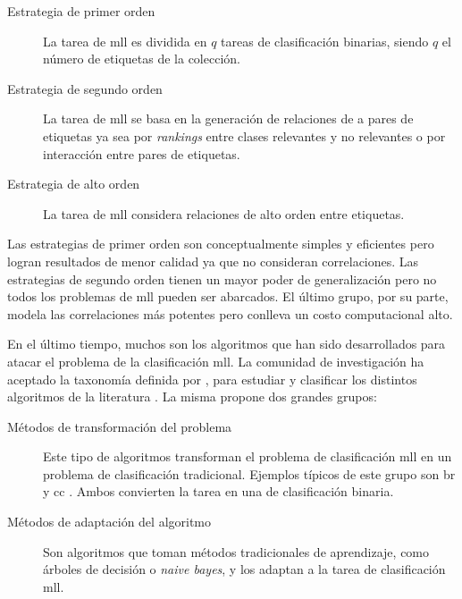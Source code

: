 \begin{description} 
\label{estrategias_mll}

   \item[Estrategia de primer orden] La tarea de \acrshort{mll} es dividida en
      $q$ tareas de clasificación binarias, siendo $q$ el número de etiquetas de
      la colección.  

   \item[Estrategia de segundo orden] La tarea de \acrshort{mll} se basa en la
      generación de relaciones de a pares de etiquetas ya sea por
      \textit{rankings} entre clases relevantes y no relevantes o por
      interacción entre pares de etiquetas.  

   \item[Estrategia de alto orden] La tarea de \acrshort{mll} considera
      relaciones de alto orden entre etiquetas.
  
\end{description}

Las estrategias de primer orden son conceptualmente simples y eficientes pero
logran resultados de menor calidad ya que no consideran correlaciones. Las
estrategias de segundo orden tienen un mayor poder de generalización pero no
todos los problemas de \acrshort{mll} pueden ser abarcados. El último grupo, por
su parte, modela las correlaciones más potentes pero conlleva un costo
computacional alto. 

En el último tiempo, muchos son los algoritmos que han sido desarrollados para
atacar el problema de la clasificación \acrshort{mll}. La comunidad de
investigación ha aceptado la taxonomía definida por
\citeauthor{tsoumakas_multi-label_2007}, para estudiar y clasificar los
distintos algoritmos de la literatura \cite {gibaja_tutorial_2015}. La misma
propone dos grandes grupos: 

\begin{description} 

   \item[Métodos de transformación del problema] Este tipo de algoritmos
      transforman el problema de clasificación \acrshort{mll} en un problema de
      clasificación tradicional. Ejemplos típicos de este grupo son \acrfull{br}
      \cite{tsoumakas_multi-label_2007} y \acrfull{cc}
      \cite{read_classifier_2011}. Ambos convierten la tarea en una de
      clasificación binaria.  

   \item[Métodos de adaptación del algoritmo] Son algoritmos que toman métodos
      tradicionales de aprendizaje, como árboles de decisión o \textit{naive
      bayes}, y los adaptan a la tarea de clasificación \acrshort{mll}.  

\end{description}

